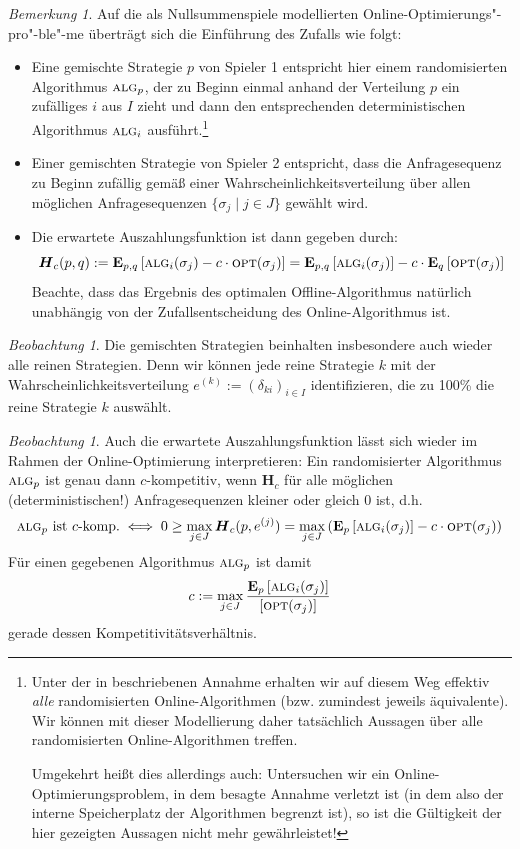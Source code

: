 \documentclass[a4paper,ngerman,12pt,bibtotoc]{scrartcl}
\theoremstyle{definition}
\theoremstyle{plain}
\theoremstyle{remark}
\newtheorem{bem}[defn]{Bemerkung}
\newtheorem{beob}[defn]{Beobachtung}
\renewcommand{\_}{\mathpunct{.}\,}
\newcommand{\?}{\,{:}\,}
\newcommand{\Alg}{\ensuremath{\textsc{alg}}}
\newcommand{\Opt}{\ensuremath{\textsc{opt}}}
\newcommand{\EE}{\mathbf{E}}
\newcommand{\EH}{\boldsymbol{H}}
\begin{document}
	\begin{bem}
		Auf die als Nullsummenspiele modellierten Online-Optimierungs"-pro"-ble"-me überträgt sich die Einführung des Zufalls wie folgt:
		\begin{itemize}
			\item Eine gemischte Strategie $p$ von Spieler 1 entspricht hier einem randomisierten Algorithmus $\Alg_p$, der zu Beginn einmal anhand der Verteilung $p$ ein zufälliges $i$ aus $I$ zieht und dann den entsprechenden deterministischen Algorithmus $\Alg_i$ ausführt.\footnote{Unter der in  beschriebenen Annahme erhalten wir auf diesem Weg effektiv \emph{alle} randomisierten Online-Algorithmen (bzw. zumindest jeweils äquivalente). Wir können mit dieser Modellierung daher tatsächlich Aussagen über alle randomisierten Online-Algorithmen treffen. 
				
			Umgekehrt heißt dies allerdings auch: Untersuchen wir ein Online-Optimierungsproblem, in dem besagte Annahme verletzt ist (in dem also der interne Speicherplatz der Algorithmen begrenzt ist), so ist die Gültigkeit der hier gezeigten Aussagen nicht mehr gewährleistet!}
			\item Einer gemischten Strategie von Spieler 2 entspricht, dass die Anfragesequenz zu Beginn zufällig gemäß einer Wahrscheinlichkeitsverteilung über allen möglichen Anfragesequenzen $\{\sigma_j \mid j \in J\}$ gewählt wird.
			\item Die erwartete Auszahlungsfunktion ist dann gegeben durch:
				\[\EH_c(p,q) := \EE_{p,q}\left[\Alg_i(\sigma_j) - c\cdot\Opt(\sigma_j)\right] = \EE_{p,q}\left[\Alg_i(\sigma_j)\right] - c\cdot\EE_{q}\left[\Opt(\sigma_j)\right]\]
			Beachte, dass das Ergebnis des optimalen Offline-Algorithmus natürlich unabhängig von der Zufallsentscheidung des Online-Algorithmus ist.
		\end{itemize}
	\end{bem}
	
	\begin{beob}
		Die gemischten Strategien beinhalten insbesondere auch wieder alle reinen Strategien. Denn wir können jede reine Strategie $k$ mit der Wahrscheinlichkeitsverteilung $e^{(k)} :=(\delta_{k i})_{i\in I}$ identifizieren, die zu 100\% die reine Strategie $k$ auswählt.
	\end{beob}
	
	\begin{beob}
		Auch die erwartete Auszahlungsfunktion lässt sich wieder im Rahmen der Online-Optimierung interpretieren: Ein randomisierter Algorithmus $\Alg_p$ ist genau dann $c$-kompetitiv, wenn $\EH_c$ für alle möglichen (deterministischen!) Anfragesequenzen kleiner oder gleich 0 ist, d.h.
		\begin{equation}\label{eq:ckomKrit}
			\Alg_p \text{ ist } c\text{-komp.} \iff 0 \geq \max_{j\in J} \EH_c(p,e^{(j)}) = \max_{j\in J}\left(\EE_{p}\left[\Alg_i(\sigma_j)\right] - c\cdot\Opt(\sigma_j)\right)
		\end{equation}
		Für einen gegebenen Algorithmus $\Alg_p$ ist damit
			\[c := \max_{j\in J}\frac{\EE_{p}\left[\Alg_i(\sigma_j)\right]}{\left[\Opt(\sigma_j)\right]}\]
		gerade dessen Kompetitivitätsverhältnis.
	\end{beob}
	
\end{document}
